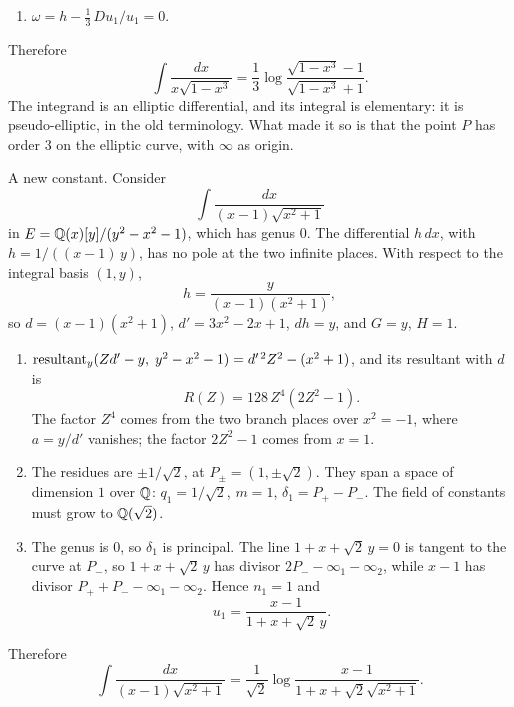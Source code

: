 \begin{example}
\begin{enumerate}
  at $P$ and nowhere else, $y + 1$ vanishes to order $3$ at $Q$ and nowhere
  else, and both have a triple pole at $\infty$. So $n_1 = 3$ and $u_1 = (y -
  1)/(y + 1)$. Example~\ref{ex:principal-running} reaches the same three
  conclusions by , without inspection.
\item $\omega = h - \frac13\, Du_1/u_1 = 0$.
\end{enumerate}
Therefore
\[
  \int \frac{dx}{x \sqrt{1 - x^3}}
  = \frac13 \log \frac{\sqrt{1 - x^3} - 1}{\sqrt{1 - x^3} + 1} .
\]
The integrand is an elliptic differential, and its integral is elementary:
it is pseudo-elliptic, in the old terminology. What made it so is that the
point $P$ has order $3$ on the elliptic curve, with $\infty$ as origin.
\end{example}

\begin{example}\label{ex:log-sqrt2}
A new constant. Consider
\[
  \int \frac{dx}{(x - 1) \sqrt{x^2 + 1}}
\]
in $E = \mathbb{Q}(x)[y]/(y^2 - x^2 - 1)$, which has genus $0$. The differential
$h\,dx$, with $h = 1/((x - 1)\, y)$, has no pole at the two infinite places.
With respect to the integral basis $(1, y)$,
\[
  h = \frac{y}{(x - 1)(x^2 + 1)} ,
\]
so $d = (x - 1)(x^2 + 1)$, $d' = 3x^2 - 2x + 1$, $dh = y$, and $G = y$, $H =
1$.
\begin{enumerate}
\item $\operatorname{resultant}_y(Z d' - y,\; y^2 - x^2 - 1) = d'^{\,2} Z^2 - (x^2 + 1)$,
  and its resultant with $d$ is
  \[
    R(Z) = 128\, Z^4 (2 Z^2 - 1) .
  \]
  The factor $Z^4$ comes from the two branch places over $x^2 = -1$, where
  $a = y/d'$ vanishes; the factor $2Z^2 - 1$ comes from $x = 1$.
\item The residues are $\pm 1/\sqrt2$, at $P_\pm = (1, \pm\sqrt2)$. They
  span a space of dimension $1$ over $\mathbb{Q}$: $q_1 = 1/\sqrt2$, $m = 1$,
  $\delta_1 = P_+ - P_-$. The field of constants must grow to $\mathbb{Q}(\sqrt2)$.
\item The genus is $0$, so $\delta_1$ is principal. The line $1 + x +
  \sqrt2\, y = 0$ is tangent to the curve at $P_-$, so $1 + x + \sqrt2\, y$
  has divisor $2 P_- - \infty_1 - \infty_2$, while $x - 1$ has divisor $P_+ +
  P_- - \infty_1 - \infty_2$. Hence $n_1 = 1$ and
  \[
    u_1 = \frac{x - 1}{1 + x + \sqrt2\, y} .
  \]
\end{enumerate}
Therefore
\[
  \int \frac{dx}{(x - 1) \sqrt{x^2 + 1}}
  = \frac{1}{\sqrt2} \log \frac{x - 1}{1 + x + \sqrt2 \sqrt{x^2 + 1}} .
\]
\end{example}

